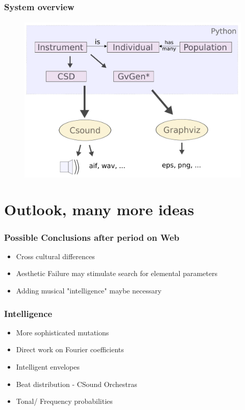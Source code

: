 \documentclass{beamer}
\begin{document}
\begin{frame}
	\frametitle{System overview}
	\framesubtitle{}
        \begin{figure}[h]
          \centering
          \includegraphics[scale=0.3]{images/overview.pdf}
	\end{figure}
\end{frame}

\label{sg:sec:imple}




\section{Outlook, many more ideas} %
\label{sg:sec:outlook_many_more_ideas}
\begin{frame}
	\frametitle{Possible Conclusions after period on Web}
	\begin{itemize}
	\item<1-> Cross cultural differences 
	\item<2-> Aesthetic Failure may stimulate search for elemental parameters
	\item<3-> Adding musical "intelligence" maybe necessary
	 \end{itemize}

\end{frame}
	
\begin{frame}
	\frametitle{Intelligence}
	\begin{itemize}
	\item<1-> More sophisticated mutations
	\item<2-> Direct work on Fourier coefficients
	\item<3-> Intelligent envelopes
	\item<4-> Beat distribution - CSound Orchestras
	\item<5-> Tonal/ Frequency probabilities
	  \end{itemize}

\end{frame}
	
\end{document}
